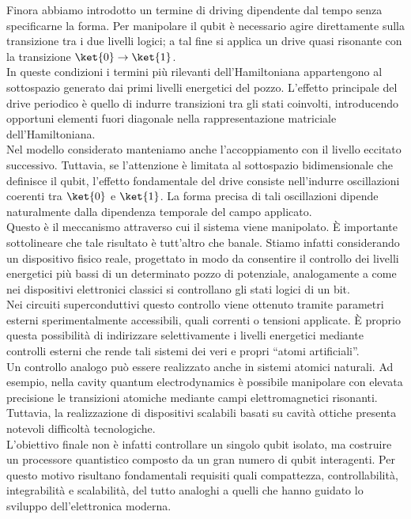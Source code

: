 Finora abbiamo introdotto un termine di driving dipendente dal tempo senza specificarne la forma. Per manipolare il qubit è necessario agire direttamente sulla transizione tra i due livelli logici; a tal fine si applica un drive quasi risonante con la transizione $\ket{0} \to \ket{1}$.\\
In queste condizioni i termini più rilevanti dell'Hamiltoniana appartengono al sottospazio generato dai primi livelli energetici del pozzo. L'effetto principale del drive periodico è quello di indurre transizioni tra gli stati coinvolti, introducendo opportuni elementi fuori diagonale nella rappresentazione matriciale dell'Hamiltoniana.\\
Nel modello considerato manteniamo anche l'accoppiamento con il livello eccitato successivo. Tuttavia, se l'attenzione è limitata al sottospazio bidimensionale che definisce il qubit, l'effetto fondamentale del drive consiste nell'indurre oscillazioni coerenti tra $\ket{0}$ e $\ket{1}$. La forma precisa di tali oscillazioni dipende naturalmente dalla dipendenza temporale del campo applicato.\\
Questo è il meccanismo attraverso cui il sistema viene manipolato. È importante sottolineare che tale risultato è tutt'altro che banale. Stiamo infatti considerando un dispositivo fisico reale, progettato in modo da consentire il controllo dei livelli energetici più bassi di un determinato pozzo di potenziale, analogamente a come nei dispositivi elettronici classici si controllano gli stati logici di un bit.\\
Nei circuiti superconduttivi questo controllo viene ottenuto tramite parametri esterni sperimentalmente accessibili, quali correnti o tensioni applicate. È proprio questa possibilità di indirizzare selettivamente i livelli energetici mediante controlli esterni che rende tali sistemi dei veri e propri ``atomi artificiali''.\\
Un controllo analogo può essere realizzato anche in sistemi atomici naturali. Ad esempio, nella cavity quantum electrodynamics è possibile manipolare con elevata precisione le transizioni atomiche mediante campi elettromagnetici risonanti. Tuttavia, la realizzazione di dispositivi scalabili basati su cavità ottiche presenta notevoli difficoltà tecnologiche.\\
L'obiettivo finale non è infatti controllare un singolo qubit isolato, ma costruire un processore quantistico composto da un gran numero di qubit interagenti. Per questo motivo risultano fondamentali requisiti quali compattezza, controllabilità, integrabilità e scalabilità, del tutto analoghi a quelli che hanno guidato lo sviluppo dell'elettronica moderna.\\
